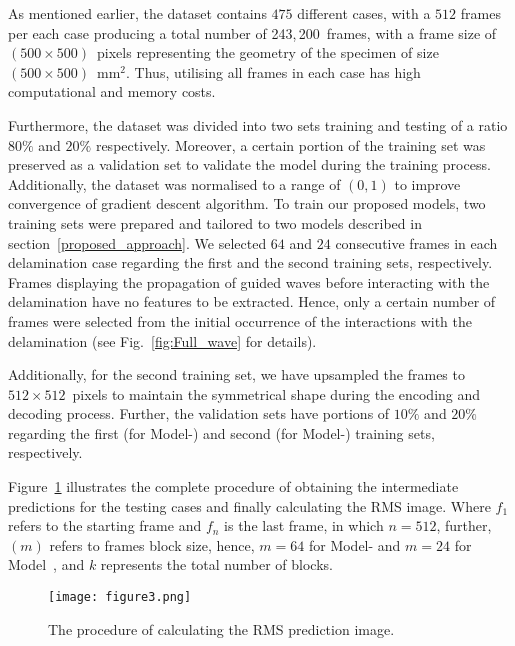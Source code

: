 As mentioned earlier, the dataset contains \(475\) different cases, with a \(512\) frames per each case producing a total number of 243,\,200~frames, with a frame size of \((500\times500)\)~pixels representing the geometry of the specimen of size \((500\times500)\)~mm\(^{2}\).
Thus, utilising all frames in each case has high computational and memory costs.

Furthermore, the dataset was divided into two sets training and testing of a ratio \(80\%\) and \(20\% \) respectively.
Moreover, a certain portion of the training set was preserved as a validation set to validate the model during the training process.
Additionally, the dataset was normalised to a range of \((0, 1)\) to improve convergence of gradient descent algorithm.
To train our proposed models, two training sets were prepared and tailored to two models described in section~\ref{proposed_approach}.
We selected \(64\) and \(24\) consecutive frames in each delamination case regarding the first and the second training sets, respectively.
Frames displaying the propagation of guided waves before interacting with the delamination have no features to be extracted.  
Hence, only a certain number of frames were selected from the initial occurrence of the interactions with the delamination (see Fig.~\ref{fig:Full_wave} for details).

Additionally, for the second training set, we have upsampled the frames to \(512\times512\)~pixels to maintain the symmetrical shape during the encoding and decoding process.
Further, the validation sets have portions of \(10\%\) and \(20\%\) regarding the first (for Model-) and second (for Model-) training sets, respectively.

Figure~\ref{fig:Diagram_exp_predictions} illustrates the complete procedure of obtaining the intermediate predictions for the testing cases and finally calculating the RMS image.
Where \(f_{1}\) refers to the starting frame and \(f_{n}\) is the last frame, in which \(n=512\), further, \((m)\) refers to frames block size, hence, \(m=64\) for Model- and \(m=24\) for Model~, and \(k\) represents the total number of blocks.
\begin{figure}[!h]
	\centering
	\texttt{[image: figure3.png]}
	\caption{The procedure of calculating the RMS prediction image.}
	\label{fig:Diagram_exp_predictions}
\end{figure}
\newpage